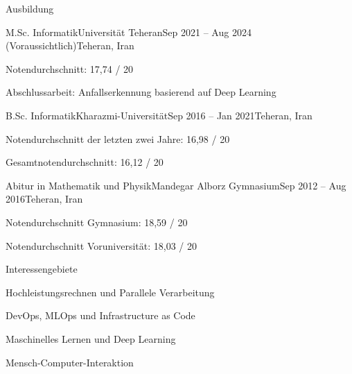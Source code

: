 \documentclass[]{main}
\begin{document}
\resumeheader
{}
{}
{}
{}
{}
{}

\begin{section}{Ausbildung}
 \begin{subsectionnobullet}{M.Sc. Informatik}{Universität Teheran}{Sep 2021 -- Aug 2024 (Voraussichtlich)}{Teheran, Iran}
     \item Notendurchschnitt: 17,74 / 20
     \item Abschlussarbeit: Anfallserkennung basierend auf Deep Learning
 \end{subsectionnobullet}
 \begin{subsectionnobullet}{B.Sc. Informatik}{Kharazmi-Universität}{Sep 2016 -- Jan 2021}{Teheran, Iran}
     \item Notendurchschnitt der letzten zwei Jahre: 16,98 / 20
     \item Gesamtnotendurchschnitt: 16,12 / 20
 \end{subsectionnobullet}
 \begin{subsectionnobullet}{Abitur in Mathematik und Physik}{Mandegar Alborz Gymnasium}{Sep 2012 -- Aug 2016}{Teheran, Iran}
     \item Notendurchschnitt Gymnasium: 18,59 / 20
     \item Notendurchschnitt Voruniversität: 18,03 / 20
 \end{subsectionnobullet}
\end{section}

\begin{section}{Interessengebiete}
 \begin{subsectionbullet}
     \item Hochleistungsrechnen und Parallele Verarbeitung
     \item DevOps, MLOps und Infrastructure as Code
     \item Maschinelles Lernen und Deep Learning
     \item Mensch-Computer-Interaktion
 \end{subsectionbullet}
\end{section}
\end{document}
